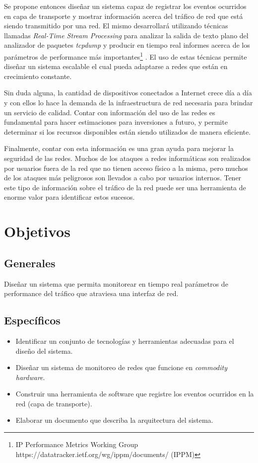 Se propone entonces diseñar un sistema capaz de registrar los eventos ocurridos en capa de transporte y mostrar información acerca del tráfico de red que está siendo transmitido por una red. El mismo desarrollará utilizando técnicas llamadas \textit{Real-Time Stream Processing} para analizar la salida de texto plano del analizador de paquetes \textit{tcpdump} y producir en tiempo real informes acerca de los parámetros de performance más importantes\footnote{IP Performance Metrics Working Group https://datatracker.ietf.org/wg/ippm/documents/ (IPPM)}
. El uso de estas técnicas permite diseñar un sistema escalable el cual pueda adaptarse a redes que están en crecimiento constante.

Sin duda alguna, la cantidad de dispositivos conectados a Internet crece día a día y con ellos lo hace la demanda de la infraestructura de red necesaria para brindar un servicio de calidad. Contar con información del uso de las redes es fundamental para hacer estimaciones para inversiones a futuro, y permite determinar si los recursos disponibles están siendo utilizados de manera eficiente.

Finalmente, contar con esta información es una gran ayuda para mejorar la seguridad de las redes. Muchos de los ataques a redes informáticas son realizados por usuarios fuera de la red que no tienen acceso físico a la misma, pero muchos de los ataques más peligrosos son llevados a cabo por usuarios internos. Tener este tipo de información sobre el tráfico de la red puede ser una herramienta de enorme valor para identificar estos sucesos.

\section*{Objetivos}
\subsection*{Generales}
Diseñar un sistema que permita monitorear en tiempo real parámetros de performance del tráfico que atraviesa una interfaz de red.
\subsection*{Específicos}
\begin{itemize}

\item Identificar un conjunto de tecnologías y herramientas adecuadas para el diseño del sistema.
\item Diseñar un sistema de monitoreo de redes que funcione en \textit{commodity hardware}.
\item Construir una herramienta de software que registre los eventos ocurridos en la red (capa de transporte).
\item Elaborar un documento que describa la arquitectura del sistema.
\end{itemize}

